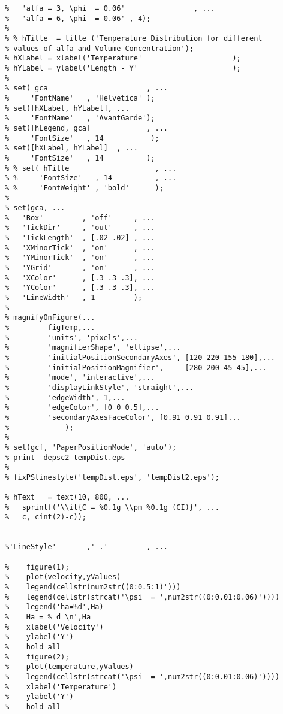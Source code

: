 \begin{lstlisting}
%   'alfa = 3, \phi  = 0.06'                , ...
%   'alfa = 6, \phi  = 0.06' , 4);
% 
% % hTitle  = title ('Temperature Distribution for different 
% values of alfa and Volume Concentration');
% hXLabel = xlabel('Temperature'                     );
% hYLabel = ylabel('Length - Y'                      );
% 
% set( gca                       , ...
%     'FontName'   , 'Helvetica' );
% set([hXLabel, hYLabel], ...
%     'FontName'   , 'AvantGarde');
% set([hLegend, gca]             , ...
%     'FontSize'   , 14           );
% set([hXLabel, hYLabel]  , ...
%     'FontSize'   , 14          );
% % set( hTitle                    , ...
% %     'FontSize'   , 14          , ...
% %     'FontWeight' , 'bold'      );
% 
% set(gca, ...
%   'Box'         , 'off'     , ...
%   'TickDir'     , 'out'     , ...
%   'TickLength'  , [.02 .02] , ...
%   'XMinorTick'  , 'on'      , ...
%   'YMinorTick'  , 'on'      , ...
%   'YGrid'       , 'on'      , ...
%   'XColor'      , [.3 .3 .3], ...
%   'YColor'      , [.3 .3 .3], ...
%   'LineWidth'   , 1         );
% 
% magnifyOnFigure(...
%         figTemp,...
%         'units', 'pixels',...
%         'magnifierShape', 'ellipse',...
%         'initialPositionSecondaryAxes', [120 220 155 180],...
%         'initialPositionMagnifier',     [280 200 45 45],...    
%         'mode', 'interactive',...    
%         'displayLinkStyle', 'straight',...        
%         'edgeWidth', 1,...
%         'edgeColor', [0 0 0.5],...
%         'secondaryAxesFaceColor', [0.91 0.91 0.91]... 
%             ); 
%         
% set(gcf, 'PaperPositionMode', 'auto');
% print -depsc2 tempDist.eps
% 
% fixPSlinestyle('tempDist.eps', 'tempDist2.eps');

% hText   = text(10, 800, ...
%   sprintf('\\it{C = %0.1g \\pm %0.1g (CI)}', ...
%   c, cint(2)-c));


%'LineStyle'       ,'-.'         , ...

%    figure(1);
%    plot(velocity,yValues)
%    legend(cellstr(num2str((0:0.5:1)')))
%    legend(cellstr(strcat('\psi  = ',num2str((0:0.01:0.06)'))))
%    legend('ha=%d',Ha)
%    Ha = % d \n',Ha
%    xlabel('Velocity')
%    ylabel('Y')
%    hold all
%    figure(2);
%    plot(temperature,yValues)
%    legend(cellstr(strcat('\psi  = ',num2str((0:0.01:0.06)'))))
%    xlabel('Temperature')
%    ylabel('Y')
%    hold all

  \end{lstlisting}
  
